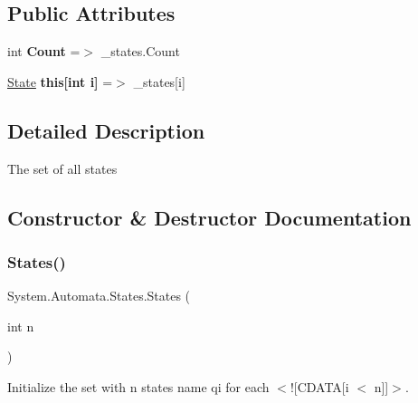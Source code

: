 \subsection*{Public Attributes}
\begin{DoxyCompactItemize}
\item 
\mbox{\label{class_system_1_1_automata_1_1_states_a8b3d8156883608ed2835b5ff35f1a1a0}} 
int {\bfseries Count} =$>$ \+\_\+states.\+Count
\item 
\mbox{\label{class_system_1_1_automata_1_1_states_a3a94ac37f606b95c5848b803668ce64f}} 
\mbox{\hyperlink{class_system_1_1_automata_1_1_state}{State}} {\bfseries this\mbox{[}int i\mbox{]}} =$>$ \+\_\+states\mbox{[}i\mbox{]}
\end{DoxyCompactItemize}


\subsection{Detailed Description}
The set of all states 



\subsection{Constructor \& Destructor Documentation}
\mbox{\label{class_system_1_1_automata_1_1_states_a850e135e490c7054d909453e6797ffb7}} 
\subsubsection{\texorpdfstring{States()}{States()}\hspace{0.1cm}{\footnotesize\ttfamily [1/2]}}
{\footnotesize\ttfamily System.\+Automata.\+States.\+States (\begin{DoxyParamCaption}\item[{int}]{n }\end{DoxyParamCaption})}



Initialize the set with n states name qi for each $<$!\mbox{[}C\+D\+A\+TA\mbox{[}i $<$ n\mbox{]}\mbox{]}$>$. 


